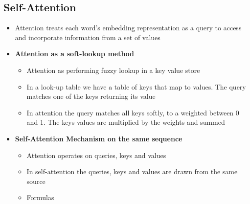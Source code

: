 \subsection{Self-Attention}
\begin{itemize}
    \item Attention treats each word's embedding representation as a query to access and incorporate information from a set of values
    \item \textbf{Attention as a soft-lookup method}
    \begin{itemize}
        \item Attention as performing fuzzy lookup in a key value store
        \item In a look-up table we have a table of keys that map to values. The query matches one of the keys returning its value
        \item In attention the query matches all keys softly, to a weighted between 0 and 1. The keys values are multiplied by the weights and summed
    \end{itemize}
    \item \textbf{Self-Attention Mechanism on the same sequence}
    \begin{itemize}
        \item Attention operates on queries, keys and values
        \item In self-attention the queries, keys and values are drawn from the same source
        \item Formulas
    \end{itemize}
\end{itemize}


